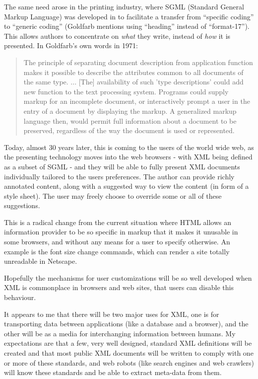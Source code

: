 The same need arose in the printing industry, where SGML (Standard
General Markup Language) was developed in
 to facilitate a transfer from ``specific coding''
to ``generic coding'' (Goldfarb mentions using ``heading'' instead of
``format-17'').  This allows authors to concentrate on \textit{what}
they write, instead of \textit{how} it is presented.  In Goldfarb's
own words in 1971:

\begin{quote}
  The principle of separating document description from application
  function makes it possible to describe the attributes common to all
  documents of the same type. ... [The] availability of such 'type
  descriptions' could add new function to the text processing system.
  Programs could supply markup for an incomplete document, or
  interactively prompt a user in the entry of a document by displaying
  the markup. A generalized markup language then, would permit full
  information about a document to be preserved, regardless of the way
  the document is used or represented.
\end{quote}

Today, almost 30 years later, this is coming to the users of the world
wide web, as the presenting technology moves into the web browsers -
with XML being defined as a subset of SGML - and they will be able to
fully present XML documents individually tailored to the users
preferences.  The author can provide richly annotated content, along
with a suggested way to view the content (in form of a style sheet).
The user may freely choose to override some or all of these suggestions.

This is a radical change from the current situation where HTML allows
an information provider to be so specific in markup that it makes it
unusable in some browsers, and without any means for a user to specify
otherwise.    An example is the font size change commands, which can
render a site totally unreadable in Netscape.

Hopefully the mechanisms for user customizations will be so well
developed when XML is commonplace in browsers and web sites, that 
users can disable this behaviour.

It appears to me that there will be two major uses for XML, one is for
transporting data between applications (like a database and a
browser), and the other will be as a media for interchanging
information between humans.  My expectations are that a few, very well
designed, standard XML definitions will be created and that most
public XML documents will be written to comply with one or more of
these standards, and web robots (like search engines and web crawlers)
will know these standards and be able to extract meta-data from them.

